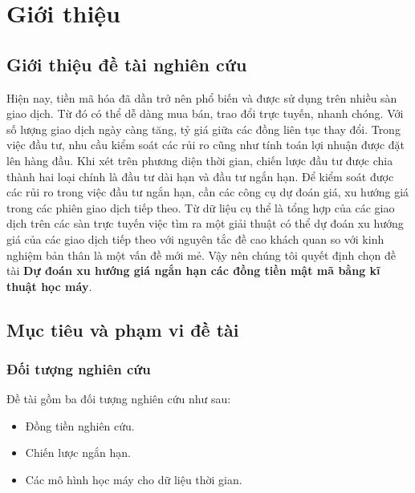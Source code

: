 \chapter{Giới thiệu} \label{chap-Intro}
\section{Giới thiệu đề tài nghiên cứu}
Hiện nay, tiền mã hóa đã dần trở nên phổ biến và được sử dụng trên nhiều sàn giao dịch. Từ đó có thể dễ dàng mua bán, trao đổi trực tuyến, nhanh chóng. Với số lượng giao dịch ngày càng tăng, tỷ giá giữa các đồng liên tục thay đổi. Trong việc đầu tư, nhu cầu kiểm soát các rủi ro cũng như tính toán lợi nhuận được đặt lên hàng đầu.
Khi xét trên phương diện thời gian, chiến lược đầu tư được chia thành hai loại chính là đầu tư dài hạn và đầu tư ngắn hạn.
Để kiểm soát được các rủi ro trong việc đầu tư ngắn hạn, cần các công cụ dự đoán giá, xu hướng giá trong các phiên giao dịch tiếp theo. Từ dữ liệu cụ thể là tổng hợp của các giao dịch trên các sàn trực tuyến việc tìm ra một giải thuật có thể dự đoán xu hướng giá của các giao dịch tiếp theo với nguyên tắc đề cao khách quan so với kinh nghiệm bản thân là một vấn đề mới mẻ. Vậy nên chúng tôi quyết định chọn đề tài \textbf{Dự đoán xu hướng giá ngắn hạn các đồng tiền mật mã bằng kĩ thuật học máy}.
\section{Mục tiêu và phạm vi đề tài}

\subsection{Đối tượng nghiên cứu}
Đề tài gồm ba đối tượng nghiên cứu như sau:
\begin{itemize}
    \item Đồng tiền nghiên cứu.
    \item Chiến lược ngắn hạn.
    \item Các mô hình học máy cho dữ liệu thời gian.
\end{itemize}

